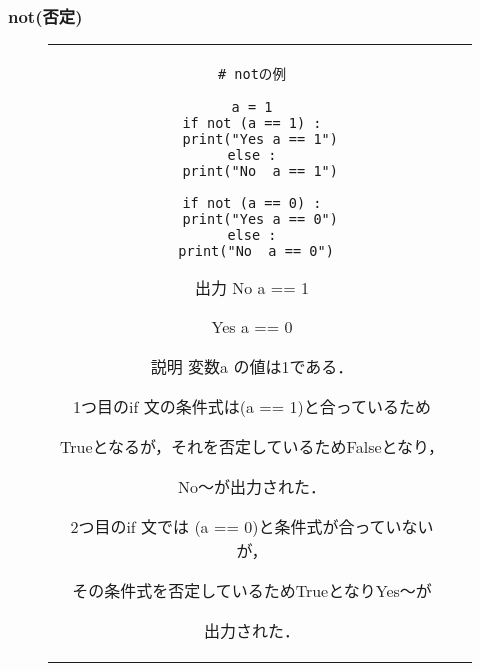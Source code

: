 \documentclass{jsarticle}
\begin{document}
\subsubsection{not(否定)}
\vspace{-5mm}
\begin{figure}[h]
	\begin{tabular}{cc}
		\begin{minipage}[t]{.4\textwidth}
			\begin{lstlisting}[caption=not]
# notの例

a = 1
if not (a == 1) :
  print("Yes a == 1")
else :
  print("No  a == 1")

if not (a == 0) :
  print("Yes a == 0")
else :
  print("No  a == 0") \end{lstlisting}
		\end{minipage} \hspace{5mm}
		\begin{minipage}[t]{.6\textwidth}
			\begin{minipage}[t]{.3\textwidth}
				\begin{itembox}[l]{出力}
					No a == 1 \par
					Yes a == 0 \par
				\end{itembox}
			\end{minipage}
			\begin{itembox}[l]{説明}
				変数a の値は1である． \par
				1つ目のif 文の条件式は(a == 1)と合っているため \par Trueとなるが，それを否定しているためFalseとなり， \par No～が出力された．\par
				2つ目のif 文では (a == 0)と条件式が合っていないが， \par その条件式を否定しているためTrueとなりYes～が \par 出力された．
			\end{itembox}
		\end{minipage}
	\end{tabular}
\end{figure}

\end{document}
